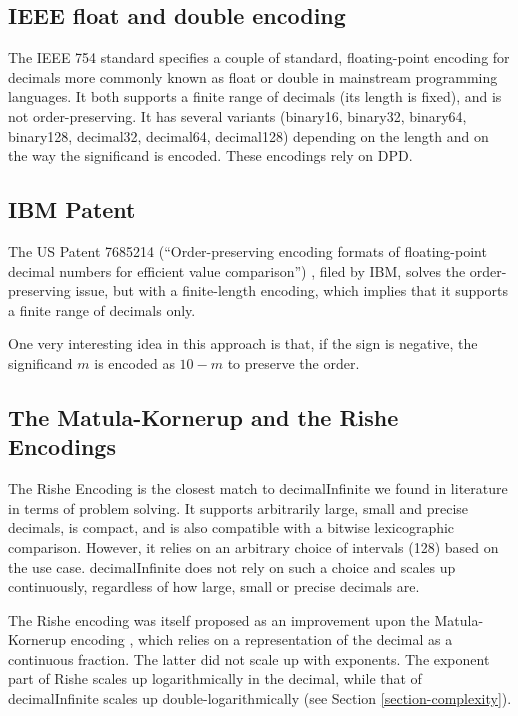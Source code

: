 \documentclass{acm_proc_article-sp}
\begin{document}
\subsection{IEEE float and double encoding}

The IEEE 754 standard specifies a couple of standard, floating-point encoding for decimals more commonly known as float or double in mainstream programming languages. It both supports a finite range of decimals (its length is fixed), and is not order-preserving. It has several variants (binary16, binary32, binary64, binary128, decimal32, decimal64, decimal128) depending on the length and on the way the significand is encoded. These encodings rely on DPD.

\subsection{IBM Patent}
The US Patent 7685214 (``Order-preserving encoding formats of floating-point decimal numbers for efficient value comparison'') , filed by IBM, solves the order-preserving issue, but with a finite-length encoding, which implies that it supports a finite range of decimals only.

One very interesting idea in this approach is that, if the sign is negative, the significand $m$ is encoded as $10-m$ to preserve the order.

\subsection{The Matula-Kornerup and the Rishe Encodings}
\label{section-rishe}

The Rishe Encoding \cite{Rishe1992} is the closest match to decimalInfinite we found in literature in terms of problem solving. It supports arbitrarily large, small and precise decimals, is compact, and is also compatible with a bitwise lexicographic comparison. However, it relies on an arbitrary choice of intervals (128) based on the use case. decimalInfinite does not rely on such a choice and scales up continuously, regardless of how large, small or precise decimals are.

The Rishe encoding was itself proposed as an improvement upon the Matula-Kornerup encoding \cite{Kornerup1983}, which relies on a representation of the decimal as a continuous fraction. The latter did not scale up with exponents. The exponent part of Rishe scales up logarithmically in the decimal, while that of decimalInfinite scales up double-logarithmically (see Section \ref{section-complexity}).
\end{document}
